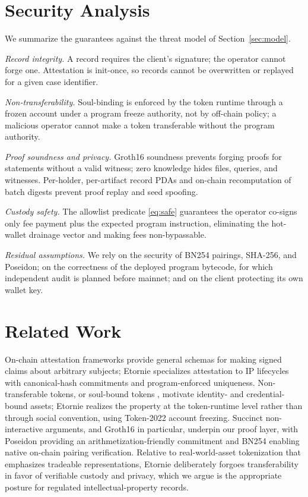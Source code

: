 \documentclass[conference]{IEEEtran}
\begin{document}
\section{Security Analysis}
\label{sec:security}

We summarize the guarantees against the threat model of
Section~\ref{sec:model}.

\emph{Record integrity.} A record requires the client's signature; the
operator cannot forge one. Attestation is init-once, so records cannot be
overwritten or replayed for a given case identifier.

\emph{Non-transferability.} Soul-binding is enforced by the token runtime
through a frozen account under a program freeze authority, not by off-chain
policy; a malicious operator cannot make a token transferable without the
program authority.

\emph{Proof soundness and privacy.} Groth16 soundness prevents forging proofs
for statements without a valid witness; zero knowledge hides files, queries,
and witnesses. Per-holder, per-artifact record PDAs and on-chain recomputation
of batch digests prevent proof replay and seed spoofing.

\emph{Custody safety.} The allowlist predicate \eqref{eq:safe} guarantees the
operator co-signs only fee payment plus the expected program instruction,
eliminating the hot-wallet drainage vector and making fees non-bypassable.

\emph{Residual assumptions.} We rely on the security of BN254 pairings,
SHA-256, and Poseidon; on the correctness of the deployed program bytecode,
for which independent audit is planned before mainnet; and on the client
protecting its own wallet key.

\section{Related Work}
\label{sec:related}

On-chain attestation frameworks provide general schemas for making signed
claims about arbitrary subjects; Etornie specializes attestation to IP
lifecycles with canonical-hash commitments and program-enforced uniqueness.
Non-transferable tokens, or soul-bound tokens \cite{sbt}, motivate
identity- and credential-bound assets; Etornie realizes the property at the
token-runtime level rather than through social convention, using Token-2022
account freezing. Succinct non-interactive arguments, and Groth16
\cite{groth16} in particular, underpin our proof layer, with Poseidon
\cite{poseidon} providing an arithmetization-friendly commitment and BN254
\cite{bn254} enabling native on-chain pairing verification. Relative to
real-world-asset tokenization that emphasizes tradeable representations,
Etornie deliberately forgoes transferability in favor of verifiable custody
and privacy, which we argue is the appropriate posture for regulated
intellectual-property records.
\end{document}
